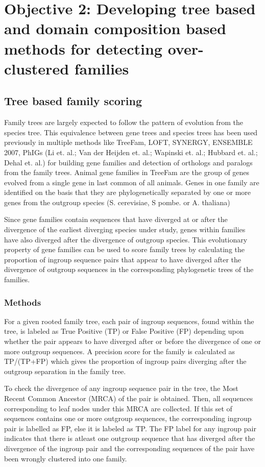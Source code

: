 \documentclass{article}
\begin{document}
			\pagebreak
	
	\section{Objective 2: Developing tree based and domain composition based methods for detecting over-clustered families}	
	\subsection{Tree based family scoring}
	Family trees are largely expected to follow the pattern of evolution from the species tree. This equivalence between gene trees and species trees has been used previously in multiple methods like TreeFam, LOFT, SYNERGY, ENSEMBLE 2007, PhIGs (Li et. al.; Van der Heijden et. al.; Wapinski et. al.; Hubbard et. al.; Dehal et. al.) for building gene families and detection of orthologs and paralogs from the family trees. Animal gene families in TreeFam are the group of genes evolved from a single gene in last common of all animals. Genes in one family are identified on the basis that they are phylogenetically separated by one or more genes from the outgroup species (S. cerevisiae, S pombe. or A. thaliana)
	
	Since gene families contain sequences that have diverged at or after the divergence of the earliest diverging species under study, genes within families have also diverged after the divergence of outgroup species. This evolutionary property of gene families can be used to score family trees by calculating the proportion of ingroup sequence pairs that appear to have diverged after the divergence of outgroup sequences in the corresponding phylogenetic trees of the families.
		\subsubsection{Methods}
		For a given rooted family tree, each pair of ingroup sequences, found within the tree, is labeled as True Positive (TP) or False Positive (FP) depending upon whether the pair appears to have diverged after or before the divergence of one or more outgroup sequences. A precision score for the family is calculated  as TP/(TP+FP) which gives the proportion of ingroup pairs diverging after the outgroup separation in the family tree.
		
		To check the divergence of any ingroup sequence pair in the tree, the Most Recent Common Ancestor (MRCA) of the pair is obtained. Then, all sequences corresponding to leaf nodes under this MRCA are collected. If this set of sequences contains one or more outgroup sequences, the corresponding ingroup pair is labelled as FP, else it is labeled as TP. The FP label for any ingroup pair indicates that there is atleast one outgroup sequence that has diverged after the divergence of the ingroup pair and the corresponding sequences of the pair have been wrongly clustered into one family. 
		
\end{document}
